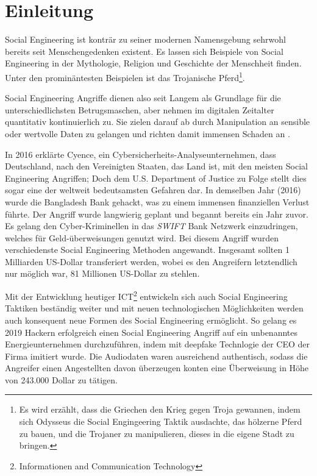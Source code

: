 \chapter{Einleitung}
\label{chapter:einleitung}

Social Engineering ist konträr zu seiner modernen Namensgebung sehrwohl bereits seit
Menschengedenken existent. Es lassen sich Beispiele von Social Engineering in der Mythologie,
Religion und Geschichte der Menschheit finden.
Unter den prominäntesten Beispielen ist das Trojanische Pferd\footnote{Es wird erzählt, dass
die Griechen den Krieg gegen Troja gewannen,
indem sich Odysseus die Social Engingeering Taktik ausdachte, das hölzerne Pferd zu bauen,
und die Trojaner zu manipulieren, dieses in die eigene Stadt zu bringen.}.

Social Engineering Angriffe dienen also seit Langem als Grundlage für die unterschiedlichsten Betrugsmaschen,
aber nehmen im digitalen Zeitalter quantitativ kontinuierlich zu.
Sie zielen darauf ab durch Manipulation an sensible oder wertvolle Daten zu gelangen
und richten damit immensen Schaden an .

In 2016 erklärte Cyence, ein Cybersicherheits-Analyseunternehmen, dass Deutschland, nach den Vereinigten Staaten,
das Land ist, mit den meisten Social Engineering Angriffen; Doch dem U.S. Department of Justice zu Folge stellt
dies sogar eine der weltweit bedeutsamsten Gefahren dar.
In demselben Jahr (2016) wurde die Bangladesh Bank gehackt, was zu einem immensen finanziellen Verlust führte.
Der Angriff wurde langwierig geplant und begannt bereits ein Jahr zuvor.
Es gelang den Cyber-Kriminellen in das \textit{SWIFT} Bank Netzwerk einzudringen, welches für Geld-überweisungen
genutzt wird. Bei diesem Angriff wurden verschiedenste Social Engineering Methoden angewandt.
Insgesamt sollten 1 Milliarden US-Dollar transferiert werden, wobei es den Angreifern
letztendlich nur möglich war, 81 Millionen US-Dollar zu stehlen.

Mit der Entwicklung heutiger ICT\footnote{Informationen and Communication Technology} entwickeln sich auch
Social Engineering Taktiken beständig weiter und mit neuen technologischen Möglichkeiten werden auch
konsequent neue Formen des Social Engineering ermöglicht.
So gelang es 2019 Hackern erfolgreich einen Social Engineering Angriff auf ein unbenanntes Energieunternehmen
durchzuführen, indem mit deepfake Technlogie der CEO der Firma imitiert wurde. Die Audiodaten waren ausreichend
authentisch, sodass die Angreifer einen Angestellten davon überzeugen konten eine Überweisung in Höhe von
243.000 Dollar zu tätigen.

